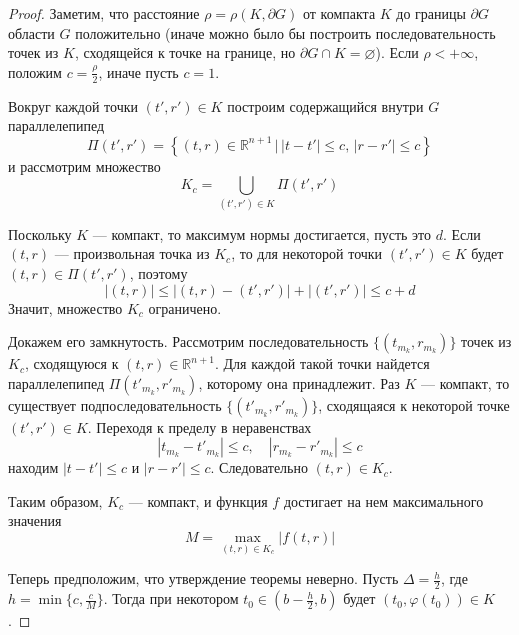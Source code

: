 \begin{proof}
    Заметим, что расстояние $\rho = \rho(K, \partial G)$ от компакта $K$ до границы $\partial G$ области $G$ положительно (иначе можно было бы построить последовательность точек из $K$, сходящейся к точке на границе, но $\partial G \cap K = \varnothing$). Если $\rho < +\infty$, положим $c = \frac{\rho}{2}$, иначе пусть $c = 1$.

    Вокруг каждой точки $(t', r') \in K$ построим содержащийся внутри $G$ параллелепипед
    \begin{equation*}
        \Pi(t',r') = \left\{(t,r) \in \mathbb{R}^{n+1}\, | \, |t-t'| \le c,\, |r - r'| \le c \right\}
    \end{equation*}
    и рассмотрим множество
    \begin{equation*}
        K_c = \bigcup_{(t',r') \in K} \Pi(t',r')
    \end{equation*}

    Поскольку $K$ --- компакт, то максимум нормы достигается, пусть это $d$. Если $(t,r)$ --- произвольная точка из $K_c$, то для некоторой точки $(t',r') \in K$ будет $(t,r) \in \Pi(t',r')$, поэтому
    \begin{equation*}
        |(t,r)| \le |(t,r) - (t',r')| + |(t',r')| \le c + d
    \end{equation*}
    Значит, множество $K_c$ ограничено.

    Докажем его замкнутость. Рассмотрим последовательность $\{(t_{m_k}, r_{m_k})\}$ точек из $K_c$, сходящуюся к $(t,r) \in \mathbb{R}^{n+1}$. Для каждой такой точки найдется параллелепипед $\Pi(t'_{m_k},r'_{m_k})$, которому она принадлежит. Раз $K$ --- компакт, то существует подпоследовательность $\{(t'_{m_k}, r'_{m_k})\}$, сходящаяся к некоторой точке $(t',r') \in K$. Переходя к пределу в неравенствах
    \begin{equation*}
        |t_{m_k} - t'_{m_k}| \le c, \quad |r_{m_k} - r'_{m_k}| \le c
    \end{equation*}
    находим $|t - t'| \le c$ и $|r - r'| \le c$. Следовательно $(t,r) \in K_c$.

    Таким образом, $K_c$ --- компакт, и функция $f$ достигает на нем максимального значения
    \begin{equation*}
        M = \max_{(t,r) \in K_c} |f(t,r)|
    \end{equation*}

    Теперь предположим, что утверждение теоремы неверно. Пусть $\Delta = \frac{h}{2}$, где $h = \min \{c, \frac{c}{M}\}$. Тогда при некотором $t_0 \in (b - \frac{h}{2}, b)$ будет $(t_0, \varphi(t_0)) \in K$.


\end{proof}
